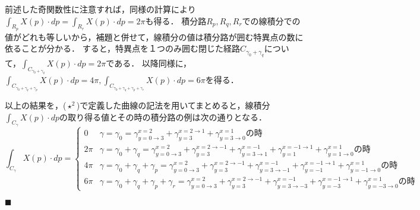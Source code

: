 \documentclass[dvipdfmx,a4paper,uplatex]{jsarticle}
\begin{document}
前述した奇関数性に注意すれば，同様の計算により$\int_{R_p}X(p)\cdot dp=\int_{R_r}X(p)\cdot dp=2\pi$も得る．
積分路$R_p,R_q,R_r$での線積分での値がどれも等しいから，補題と併せて，線積分の値は積分路が囲む特異点の数に依ることが分かる．
すると，特異点を１つのみ囲む閉じた経路$C_{\gamma_0+\gamma_q}$について，$\int_{C_{\gamma_0+\gamma_q}}X(p)\cdot dp=2\pi$である．
以降同様に，$\int_{C_{\gamma_0+\gamma_q+\gamma_p}}X(p)\cdot dp=4\pi, \int_{C_{\gamma_0+\gamma_q+\gamma_p+\gamma_r}}X(p)\cdot dp=6\pi$を得る．

以上の結果を，($\star^2$)で定義した曲線の記法を用いてまとめると，線積分$\int_{C_\gamma}X(p)\cdot dp$の取り得る値とその時の積分路の例は次の通りとなる．
\[
    \int_{C_\gamma}X(p)\cdot dp = 
    \begin{cases}
        0 & \gamma=\gamma_0=\gamma^{x=2}_{y=0\to 3}+\gamma^{x=2\to 1}_{y=3}+\gamma^{x=1}_{y=3\to 0}の時\\
        2\pi & \gamma=\gamma_0+\gamma_q=\gamma^{x=2}_{y=0\to 3}+\gamma^{x=2\to -1}_{y=3}+\gamma^{x=-1}_{y=3\to 1}+\gamma^{x=-1\to 1}_{y=1}+\gamma^{x=1}_{y=1\to 0}の時\\
        4\pi & \gamma=\gamma_0+\gamma_q+\gamma_p=\gamma^{x=2}_{y=0\to 3}+\gamma^{x=2\to -1}_{y=3}+\gamma^{x=-1}_{y=3\to -1}+\gamma^{x=-1\to 1}_{y=-1}+\gamma^{x=1}_{y=-1\to 0}の時\\
        6\pi & \gamma=\gamma_0+\gamma_q+\gamma_p+\gamma_r=\gamma^{x=2}_{y=0\to 3}+\gamma^{x=2\to -1}_{y=3}+\gamma^{x=-1}_{y=3\to -3}+\gamma^{x=-1\to 1}_{y=-3}+\gamma^{x=1}_{y=-3\to 0}の時
    \end{cases}
\]
\begin{flushright}
    $\blacksquare$
\end{flushright}
\end{document}
